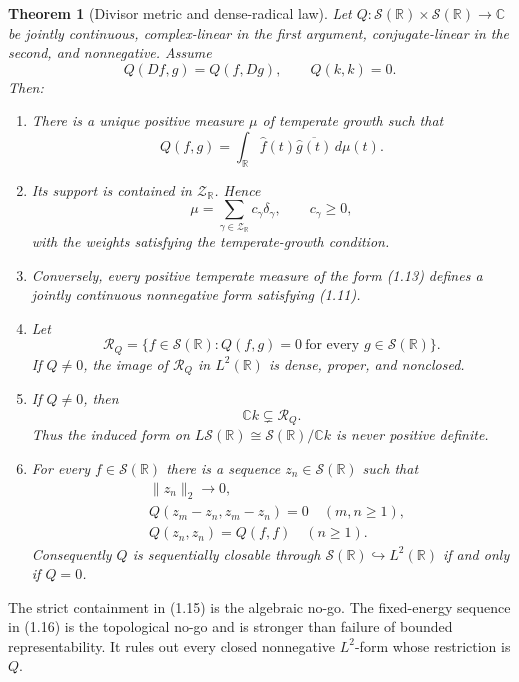 \documentclass[11pt]{article}
\newtheorem{theorem}{Theorem}[section]
\newcommand{\C}{\mathbb C}
\newcommand{\R}{\mathbb R}
\newcommand{\cS}{\mathcal S}
\newcommand{\cR}{\mathcal R}
\newcommand{\cZ}{\mathcal Z}
\begin{document}
\begin{theorem}[Divisor metric and dense-radical law]\label{thm:main}
Let \(Q:\cS(\R)\times\cS(\R)\to\C\) be jointly continuous, complex-linear in the first
argument, conjugate-linear in the second, and nonnegative.  Assume
\[
 Q(Df,g)=Q(f,Dg),\qquad Q(k,k)=0.
 \tag{1.11}
\]
Then:
\begin{enumerate}[label=\textup{(\roman*)}]
\item There is a unique positive measure \(\mu\) of temperate growth such that
\[
 Q(f,g)=\int_{\R}\widehat f(t)\overline{\widehat g(t)}\,d\mu(t).
 \tag{1.12}
\]
\item Its support is contained in \(\cZ_{\R}\).  Hence
\[
 \mu=\sum_{\gamma\in\cZ_{\R}}c_\gamma\delta_\gamma,
 \qquad c_\gamma\ge0,
 \tag{1.13}
\]
with the weights satisfying the temperate-growth condition.
\item Conversely, every positive temperate measure of the form \textup{(1.13)} defines a
jointly continuous nonnegative form satisfying \textup{(1.11)}.
\item Let
\[
 \cR_Q=\{f\in\cS(\R):Q(f,g)=0\ \text{for every }g\in\cS(\R)\}.
 \tag{1.14}
\]
If \(Q\neq0\), the image of \(\cR_Q\) in \(L^2(\R)\) is dense, proper, and nonclosed.
\item If \(Q\neq0\), then
\[
 \C k\subsetneq\cR_Q.
 \tag{1.15}
\]
Thus the induced form on \(L\cS(\R)\cong\cS(\R)/\C k\) is never positive definite.
\item For every \(f\in\cS(\R)\) there is a sequence \(z_n\in\cS(\R)\) such that
\[
\begin{split}
 &\|z_n\|_2\longrightarrow0,\\
 &Q(z_m-z_n,z_m-z_n)=0\quad(m,n\ge1),\\
 &Q(z_n,z_n)=Q(f,f)\quad(n\ge1).
\end{split}
\tag{1.16}
\]
Consequently \(Q\) is sequentially closable through \(\cS(\R)\hookrightarrow L^2(\R)\) if
and only if \(Q=0\).
\end{enumerate}
\end{theorem}

The strict containment in (1.15) is the algebraic no-go.  The fixed-energy sequence in (1.16) is
the topological no-go and is stronger than failure of bounded representability.  It
rules out every closed nonnegative \(L^2\)-form whose restriction is \(Q\).
\end{document}
